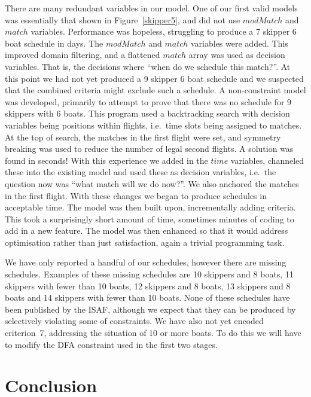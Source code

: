 \documentclass{llncs}
\newcommand{\match}{\mathit{match}}
\newcommand{\modMatch}{\mathit{modMatch}}
\newcommand{\timeVar}{\mathit{time}}
\begin{document}
There are many redundant variables in our model. One of our first valid models was essentially that
shown in Figure~\ref{skipper5}, and did not use $\modMatch$ and $\match$ variables. Performance was
hopeless, struggling to produce a 7 skipper 6 boat schedule in days. The $\modMatch$ and $\match$
variables were added. This improved domain filtering, and a flattened $\match$ array was used as
decision variables. That is, the decisions where ``when do we schedule this match?''.  At this point
we had not yet produced a 9 skipper 6 boat schedule and we suspected that the combined criteria
might exclude such a schedule. A non-constraint model was developed, primarily
to attempt to prove that there was no schedule for 9 skippers with 6 boats. This program used a
backtracking search with decision variables being positions within flights, i.e.\ time slots being
assigned to matches. At the top of search, the matches in the first flight were set, and symmetry
breaking was used to reduce the number of legal second flights. A solution was found in seconds!
With this experience we added in the $\timeVar$ variables, channeled these into the existing model
and used these as decision variables, i.e.\ the question now was ``what match will we do now?''. We
also anchored the matches in the first flight. With these changes we began to produce schedules in
acceptable time. The model was then built upon, incrementally adding criteria. This took a
surprisingly short amount of time, sometimes minutes of coding to add in a new feature. The model
was then enhanced so that it would address optimisation rather than just satisfaction, again a
trivial programming task.

We have only reported a handful of our schedules, however there are missing schedules. Examples of
these missing schedules are 10 skippers and 8 boats, 11 skippers with fewer than 10 boats, 12
skippers and 8 boats, 13 skippers and 8 boats and 14 skippers with fewer than 10 boats. None of these
schedules have been published by the ISAF, although we expect that they can be produced by
selectively violating some of constraints. We have also not yet encoded criterion~7, addressing the
situation of 10 or more boats. To do this we will have to modify the DFA constraint used in the
first two stages.

\section{Conclusion}\label{sec:conclusions}
\end{document}
